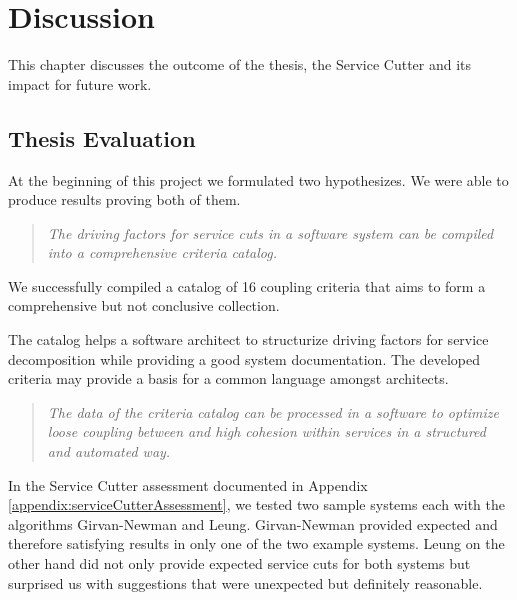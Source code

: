 \chapter{Discussion}

This chapter discusses the outcome of the thesis, the Service Cutter and its impact for future work.



\section{Thesis Evaluation}

At the beginning of this project we formulated two hypothesizes. We were able to produce results proving both of them.

\begin{quote}
	\textit{The driving factors for service cuts in a software system can be compiled into a comprehensive criteria catalog.}
\end{quote}

We successfully compiled a catalog of 16 coupling criteria that aims to form a comprehensive but not conclusive collection. 

The catalog helps a software architect to structurize driving factors for service decomposition while providing a good system documentation. The developed criteria may provide a basis for a common language amongst architects. 


\begin{quote}
	\textit{The data of the criteria catalog can be processed in a software to optimize loose coupling between and high cohesion within services in a structured and automated way.}
\end{quote}

In the Service Cutter assessment documented in Appendix \ref{appendix:serviceCutterAssessment}, we tested two sample systems each with the algorithms Girvan-Newman and Leung. Girvan-Newman provided expected and therefore satisfying results in only one of the two example systems. Leung on the other hand did not only provide expected service cuts for both systems but surprised us with suggestions that were unexpected but definitely reasonable.  

